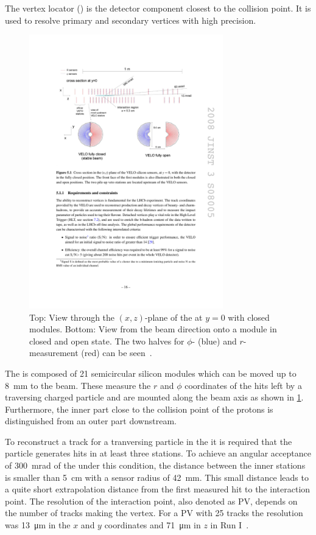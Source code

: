 The vertex locator (\velo) is the detector component closest to the collision point.
It is used to resolve primary and secondary vertices with high precision.
\begin{figure}[tbp]
    \centering
    \includegraphics[width=0.75\textwidth]{05lhcb/figs/velo.pdf}
    \caption{Top: View through the $(x,z)$-plane of the \velo at $y=0$ with closed modules.
    Bottom: View from the beam direction onto a module in closed and open state.
    The two halves for $\phi$- (blue) and $r$-measurement (red) can be seen~\cite{Alves:2008zz}.}
    \label{fig:velo}
\end{figure}
The \velo is composed of \num{21} semicircular silicon modules which can be moved up to \SI{8}{\milli\metre} to the beam.
These measure the $r$ and $\phi$ coordinates of the hits left by a traversing charged particle and are mounted along the beam axis as shown in \cref{fig:velo}.
Furthermore, the inner part close to the collision point of the protons is distinguished from an outer part downstream.

To reconstruct a track for a tranversing particle in the \velo it is required that the particle generates hits in at least three stations.
To achieve an angular acceptance of \SI{300}{\milli\radian} of the \velo under this condition, the distance between the inner stations is smaller than \SI{5}{\centi\metre} with a sensor radius of \SI{42}{\milli\metre}.
This small distance leads to a quite short extrapolation distance from the first measured hit to the interaction point.
The resolution of the interaction point, also denoted as \ac{PV}, depends on the number of tracks making the vertex.
For a \ac{PV} with \num{25} tracks the resolution was \SI{13}{\micro\metre} in the $x$ and $y$ coordinates and \SI{71}{\micro\metre} in $z$ in Run I~\cite{Aaij:2014jba}.

